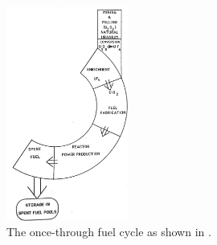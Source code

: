 \begin{figure}[]
  \begin{center}
    \includegraphics[width=4cm]{./chapters/intro/open_cycle.png}
  \caption{The once-through fuel cycle as shown in \cite{cochran1990nuclear}.}
  \label{fig:open-cycle}
  \end{center}
\end{figure}
